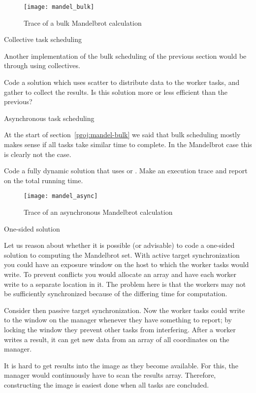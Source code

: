 \begin{figure}[ht]
\texttt{[image: mandel\_bulk]}
\caption{Trace of a bulk Mandelbrot calculation}
\label{fig:mandel-bulk}
\end{figure}

 {Collective task scheduling}
\label{proj:mandel-collective}

Another implementation of the bulk scheduling of the previous section
would be through using collectives.

\begin{exercise}
  Code a solution which uses scatter to distribute data to the worker
  tasks, and gather to collect the results. Is this solution more or
  less efficient than the previous?
\end{exercise}

 {Asynchronous task scheduling}

At the start of section~\ref{proj:mandel-bulk} we said that bulk scheduling
mostly makes sense if all tasks take similar time to complete.
In the Mandelbrot case this is clearly not the case.

\begin{exercise}
  Code a fully dynamic solution that uses  or .
  Make an execution trace and report on the total running time.
\end{exercise}

\begin{figure}[ht]
\texttt{[image: mandel\_async]}
\caption{Trace of an asynchronous Mandelbrot calculation}
\label{fig:mandel-async}
\end{figure}

 {One-sided solution}

Let us reason about whether it is possible (or advisable) to code a
one-sided solution to computing the Mandelbrot set.  
%
With active
target synchronization you could have an exposure window on the host
to which the worker tasks would write. To prevent conflicts you would allocate an 
array and have each worker write to a separate location in it.
%
The problem here is that the workers may not be sufficiently synchronized because
of the differing time for computation.

Consider then passive target synchronization. Now the worker tasks could
write to the window on the manager whenever they have something to
report; by locking the window they prevent other tasks from interfering.
%
After a worker writes a result, it can get new data from an array
of all coordinates on the manager. 

It is hard to get results into the image as they become available. For
this, the manager would continuously have to scan the results
array. Therefore, constructing the image is easiest done when all
tasks are concluded.
